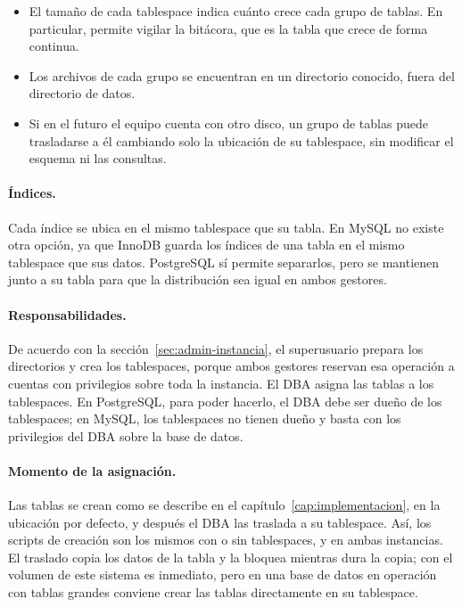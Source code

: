 \begin{itemize}[leftmargin=*]
	\item El tamaño de cada tablespace indica cuánto crece cada grupo de tablas. En particular, permite vigilar la bitácora, que es la tabla que crece de forma continua.
	\item Los archivos de cada grupo se encuentran en un directorio conocido, fuera del directorio de datos.
	\item Si en el futuro el equipo cuenta con otro disco, un grupo de tablas puede trasladarse a él cambiando solo la ubicación de su tablespace, sin modificar el esquema ni las consultas.
\end{itemize}

\paragraph{Índices.} Cada índice se ubica en el mismo tablespace que su tabla. En MySQL no existe otra opción, ya que InnoDB guarda los índices de una tabla en el mismo tablespace que sus datos. PostgreSQL sí permite separarlos, pero se mantienen junto a su tabla para que la distribución sea igual en ambos gestores.

\paragraph{Responsabilidades.} De acuerdo con la sección~\ref{sec:admin-instancia}, el superusuario prepara los directorios y crea los tablespaces, porque ambos gestores reservan esa operación a cuentas con privilegios sobre toda la instancia. El DBA asigna las tablas a los tablespaces. En PostgreSQL, para poder hacerlo, el DBA debe ser dueño de los tablespaces; en MySQL, los tablespaces no tienen dueño y basta con los privilegios del DBA sobre la base de datos.

\paragraph{Momento de la asignación.} Las tablas se crean como se describe en el capítulo~\ref{cap:implementacion}, en la ubicación por defecto, y después el DBA las traslada a su tablespace. Así, los scripts de creación son los mismos con o sin tablespaces, y en ambas instancias. El traslado copia los datos de la tabla y la bloquea mientras dura la copia; con el volumen de este sistema es inmediato, pero en una base de datos en operación con tablas grandes conviene crear las tablas directamente en su tablespace.

